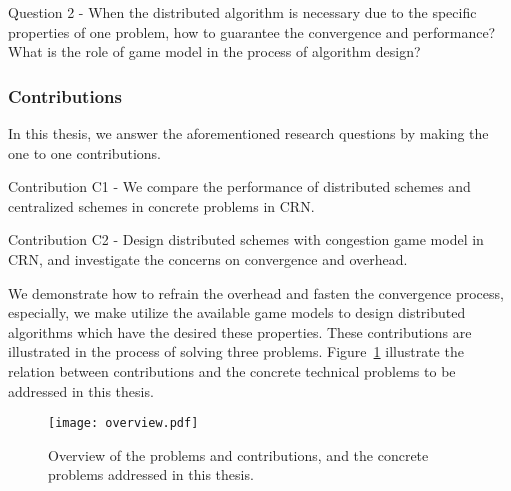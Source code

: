 Question 2 - When the distributed algorithm is necessary due to the specific properties of one problem, how to guarantee the convergence and performance? What is the role of game model in the process of algorithm design?

%
%



\subsubsection{Contributions}
In this thesis, we answer the aforementioned research questions by making the one to one contributions.

Contribution C1 - We compare the performance of distributed schemes and centralized schemes in concrete problems in CRN.

Contribution C2 - Design distributed schemes with congestion game model in CRN, and investigate the concerns on convergence and overhead.

We demonstrate how to refrain the overhead and fasten the convergence process, especially, we make utilize the available game models to design distributed algorithms which have the desired these properties.
These contributions are illustrated in the process of solving three problems.
Figure~\ref{overview} illustrate the relation between contributions and the concrete technical problems to be addressed in this thesis.
\begin{figure}[h!]
  \centering
  \texttt{[image: overview.pdf]}
  \caption{Overview of the problems and contributions, and the concrete problems addressed in this thesis.}
\label{overview}
\end{figure}


